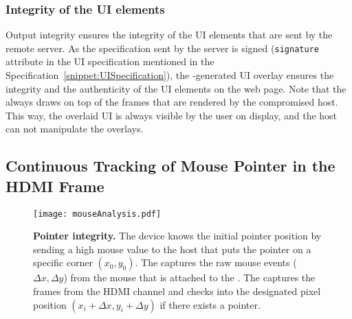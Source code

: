 \subsubsection{\bfseries Integrity of the UI elements} Output integrity ensures the integrity of the UI elements that are sent by the remote server. As the specification sent by the server is signed (\texttt{signature} attribute in the UI specification mentioned in the Specification~\ref{snippet:UISpecification}), the \device-generated UI overlay ensures the integrity and the authenticity of the UI elements on the web page. Note that the \device always draws on top of the frames that are rendered by the compromised host. This way, the overlaid UI is always visible by the user on display, and the host can not manipulate the overlays.



\subsection{Continuous Tracking of Mouse Pointer in the HDMI Frame}
\label{sec:systemDesign:analysis}


\begin{figure}[t]
\centering
\texttt{[image: mouseAnalysis.pdf]}
\caption{\textbf{Pointer integrity.} The device knows the initial pointer position by sending a high mouse value to the host that puts the pointer on a specific corner $(x_0, y_0)$. \one The \device captures the raw mouse events ($\Delta x, \Delta y$) from the mouse that is attached to the \device. \two The \device captures the frames from the HDMI channel and checks into the designated pixel position $(x_i + \Delta x, y_i + \Delta y)$ if there exists a pointer.}
\label{fig:mouseAnalysis}
\centering
\end{figure}

